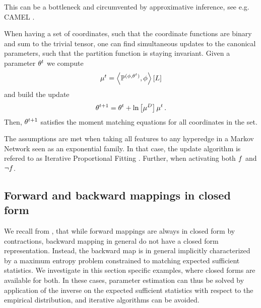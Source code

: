 This can be a bottleneck and circumvented by approximative inference, see e.g. CAMEL \cite{ganapathi_constrained_2008}.



\begin{remark}
	When having a set of coordinates, such that the coordinate functions are binary and sum to the trivial tensor, one can find simultaneous updates to the canonical parameters, such that the partition function is staying invariant.
	Given a parameter $\theta^t$ we compute
		\[ \mu^t = \left\langle \mathbb{P}^{(\phi,\theta^t)}, \phi\right\rangle \left[ L \right] \]
	and build the update
		\[ \theta^{t+1} = \theta^t + \ln \left[ \mu^{D} \right]{\mu^t} \, . \]
	Then, $\theta^{t+1}$ satisfies the moment matching equations for all coordinates in the set.
	
	
	The assumptions are met when taking all features to any hyperedge in a Markov Network seen as an exponential family.
	In that case, the update algorithm is refered to as  Iterative Proportional Fitting \cite{wainwright_graphical_2008}.
	Further, when activating both $f$ and $\lnot f$.
\end{remark}


\subsection{Forward and backward mappings in closed form}

We recall from , that while forward mappings are always in closed form by contractions, backward mapping in general do not have a closed form representation.
Instead, the backward map is in general implicitly characterized by a maximum entropy problem constrained to matching expected sufficient statistics.
We investigate in this section specific examples, where closed forms are available for both.
In these cases, parameter estimation can thus be solved by application of the inverse on the expected sufficient statistics with respect to the empirical distribution, and iterative algorithms can be avoided.


